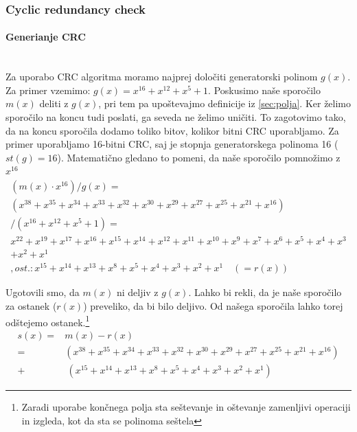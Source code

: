 \documentclass[12pt]{article}
\begin{document}
        \subsubsection{Cyclic redundancy check}
            \paragraph{Generianje CRC} \mbox{}\\
            Za uporabo CRC algoritma moramo najprej določiti generatorski 
            polinom $g(x)$. Za primer vzemimo: $g(x)=x^{16}+x^{12}+x^5+1$.
            Poskusimo naše sporočilo $m(x)$ deliti z $g(x)$, pri tem pa 
            upoštevajmo definicije iz \ref{sec:polja}.
            Ker želimo sporočilo na koncu tudi poslati, ga seveda ne želimo 
            uničiti. To zagotovimo tako, da na koncu sporočila dodamo toliko
            bitov, kolikor bitni CRC uporabljamo. Za primer uporabljamo 16-bitni
            CRC, saj je stopnja generatorskega polinoma 16 ($st(g)=16$). 
            Matematično gledano to pomeni, da naše sporočilo pomnožimo z 
            $x^{16}$ 
            \begin{equation}
                \begin{split}
                    (m(x) \cdot x^{16})/g(x) =\\
                    (x^{38} + x^{35} + x^{34} + x^{33} + x^{32} +
                    x^{30} + x^{29} + x^{27} + x^{25} + x^{21} + x^{16})\\
                    /(x^{16} +x^{12} + x^5 + 1)=\\
                    x^{22} + x^{19} + x^{17} + x^{16} + x^{15} +
                    x^{14} + x^{12} + x^{11} + x^{10} + x^{9} + x^{7} + 
                    x^{6} + x^{5} + x^{4} + x^{3}\\ + x^{2} + x^{1}\\
                    , ost.: x^{15} + x^{14} + x^{13} + x^8 + x^5 + x^4 + x^3 + 
                    x^2 + x^1 \quad (=r(x))
                \end{split}
            \end{equation}

            Ugotovili smo, da $m(x)$ ni deljiv z $g(x)$. Lahko bi rekli, da je 
            naše sporočilo za ostanek ($r(x)$) preveliko, da bi bilo deljivo. 
            Od našega sporočila lahko torej odštejemo ostanek.\footnote{Zaradi 
            uporabe končnega polja sta seštevanje in oštevanje zamenljivi 
            operaciji in izgleda, kot da sta se polinoma seštela}
            \begin{equation}
                \begin{split}
                    s(x) = & m(x) - r(x)\\
                    = & (x^{38} + x^{35} + x^{34} + x^{33} + x^{32} +
                    x^{30} + x^{29} + x^{27} + x^{25} + x^{21} + x^{16})\\
                    + & \: (x^{15} + x^{14} + x^{13} + x^8 + x^5 + x^4 + x^3 + 
                    x^2 + x^1)                    
                \end{split}
            \end{equation}
\end{document}
